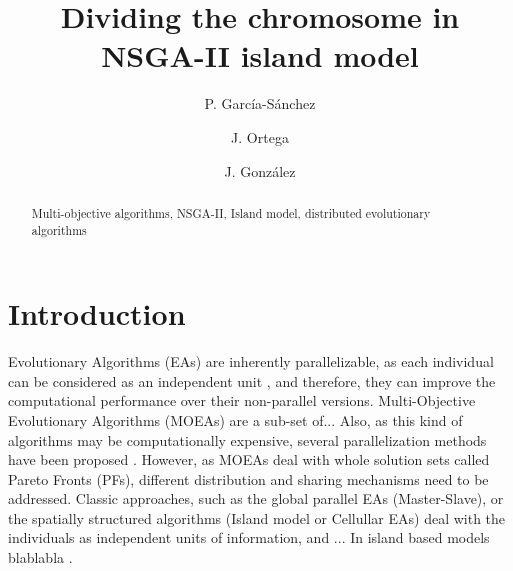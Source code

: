 \documentclass[runningheads,a4paper]{llncs}
\newcommand{\keywords}[1]{\par\addvspace\baselineskip
\noindent\keywordname\enspace\ignorespaces#1}
\begin{document}
\mainmatter  %

\title{Dividing the chromosome in NSGA-II island model} %

\titlerunning{}

%
%
\author{P. Garc\'ia-S\'anchez \and J. Ortega \and J. Gonz\'alez}
%


%
%




\maketitle

%
%
\begin{abstract}

\keywords{Multi-objective algorithms, NSGA-II, Island model, distributed evolutionary algorithms}
\end{abstract}

%
%
\section{Introduction}

Evolutionary Algorithms (EAs) are inherently parallelizable, as each individual can be considered as an independent unit \cite{Alba13parallel}, and therefore, they can improve the computational performance over their non-parallel versions. Multi-Objective Evolutionary Algorithms (MOEAs) are a sub-set of... Also, as this kind of algorithms may be computationally expensive, several parallelization methods have been proposed \cite{Luna15Survey}. However, as MOEAs deal with whole solution sets called Pareto Fronts (PFs), different distribution and sharing mechanisms need to be addressed. Classic approaches, such as the global parallel EAs (Master-Slave), or the spatially structured algorithms (Island model or Cellullar EAs) deal with the individuals as independent units of information, and ...  In island based models blablabla .  
\end{document}
